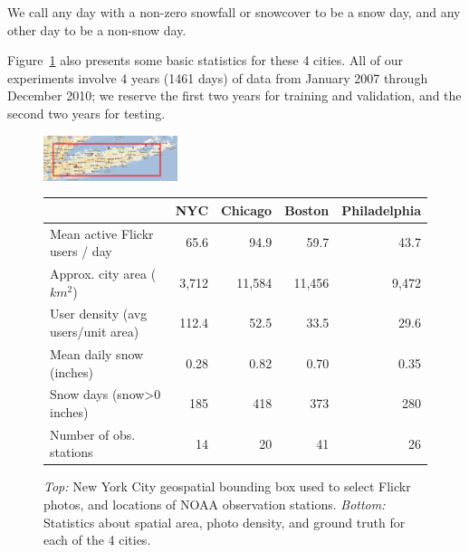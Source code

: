 \documentclass[10pt,journal,compsoc]{IEEEtran}
\begin{document}
We call any day with a non-zero snowfall or snowcover to be a snow day,
and any other day to be a non-snow day.

Figure~\ref{tab:city_statistics} also presents some basic statistics for
these 4 cities.  All of our experiments involve 4 years (1461 days) of
data from January 2007 through December 2010; we reserve the first two
years for training and validation, and the second two years for
testing.


\begin{figure}
\begin{center}
\includegraphics[width=0.35\textwidth]{plots/nyc_stations.png} 
\end{center}
\begin{center}
{\small{
\newcommand{\spc}{\hspace{2pt}}
\begin{tabular} {|@{\spc}l@{\spc}|@{\spc}r@{\spc}|@{\spc}r@{\spc}|@{\spc}r@{\spc}|@{\spc}r@{\spc}|} 
\hline 
\textbf{} &{NYC}  &{Chicago} &{Boston}&{Philadelphia} \tabularnewline
\hline 
{Mean active Flickr users / day} &{65.6} &{94.9} &{59.7} &{43.7} \tabularnewline
\hline 
{Approx. city area ($km^2$)} &{3,712} &{11,584} &{11,456} &{9,472}  \tabularnewline
\hline 
{User density (avg users/unit area)} &{112.4} &{52.5} &{33.5} &{29.6} \tabularnewline
\hline 
{Mean daily snow (inches)} &{0.28} &{0.82} &{0.70} &{0.35} \tabularnewline
\hline 
{Snow days (snow>0 inches)} &{185} &{418} &{373} &{280} \tabularnewline
\hline 
{Number of obs. stations} &{14} &{20} &{41} &{26} \tabularnewline
\hline 
\end{tabular}}}
\end{center}
\vspace{-12pt}
 \caption {\textit{Top:} New York City geospatial bounding box used to select Flickr photos, and locations of NOAA observation stations. \textit{Bottom:} Statistics about spatial area, photo density, and ground truth for each of the 4 cities.}
\label{tab:city_statistics} 
\end{figure}
\end{document}
